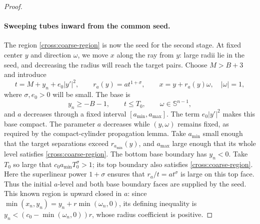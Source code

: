 \documentclass[11pt]{article}
\theoremstyle{definition}
\theoremstyle{remark}
\numberwithin{equation}{section}
\begin{document}
\begin{proof}
\paragraph{Sweeping tubes inward from the common seed.}
The region \eqref{cross:coarse-region} is now the seed for the second
stage. At fixed center $y$ and direction $\omega$, we move $x$ along the
ray from $y$: large radii lie in the seed, and decreasing the radius
will reach the target pairs. Choose $M>B+3$ and introduce
\begin{equation}\label{cross:tubes}
 t=M+y_n+e_0|y'|^2,\qquad r_a(y)=a t^{1+\sigma},\qquad
 x=y+r_a(y)\omega,\quad |\omega|=1,
\end{equation}
where $\sigma,e_0>0$ will be small.  The base is
\[
 y_n\ge-B-1,\qquad t\le T_0,\qquad \omega\in\mathbb S^{n-1},
\]
and $a$ decreases through a fixed interval $[a_{\min},a_{\max}]$.
The term $e_0|y'|^2$ makes this base compact. The parameter $a$ decreases
while $(y,\omega)$ remains fixed, as required by the compact-cylinder
propagation lemma.
Take $a_{\min}$ small enough that the target separations exceed
$r_{a_{\min}}(y)$, and $a_{\max}$ large enough that its whole level
satisfies \eqref{cross:coarse-region}.  The bottom base boundary has
$y_n<0$.  Take $T_0$ so large that
$c_0a_{\min}T_0^\sigma>1$; its top boundary also satisfies
\eqref{cross:coarse-region}. Here the superlinear power $1+\sigma$
ensures that $r_a/t=a t^\sigma$ is large on this top face. Thus the
initial $a$-level and both base boundary faces are supplied by the seed.
This known region is upward closed in $a$: since
$\min(x_n,y_n)=y_n+r\min(\omega_n,0)$, its defining
inequality is $y_n<(c_0-\min(\omega_n,0))r$, whose radius coefficient
is positive.


\end{proof}
\end{document}
